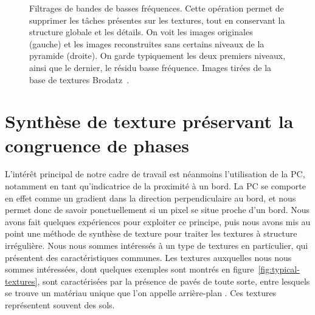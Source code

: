 \begin{figure}
    \caption[Filtrage de bandes de basses fréquences]{Filtrages de bandes de basses fréquences. Cette opération permet de supprimer les tâches présentes sur les textures, tout en conservant la structure globale et les détails. On voit les images originales (gauche) et les images reconstruites sans certains niveaux de la pyramide (droite). On garde typiquement les deux premiers niveaux, ainsi que le dernier, le résidu basse fréquence. Images tirées de la base de textures Brodatz~\cite{abdelmounaime_new_2013}.}
    \label{fig:filter-low-freq}
\end{figure}

\section{Synthèse de texture préservant la congruence de phases}

L'intérêt principal de notre cadre de travail est néanmoins l'utilisation de la PC, notamment en tant qu'indicatrice de la proximité à un bord. La PC se comporte en effet comme un gradient dans la direction perpendiculaire au bord, et nous permet donc de savoir ponctuellement si un pixel se situe proche d'un bord. Nous avons fait quelques expériences pour exploiter ce principe, puis nous avons mis au point une méthode de synthèse de texture pour traiter les textures à structure irrégulière. Nous nous sommes intéressés à un type de textures en particulier, qui présentent des caractéristiques communes. Les textures auxquelles nous nous sommes intéressées, dont quelques exemples sont montrés en figure~\ref{fig:typical-textures}, sont caractérisées par la présence de pavés de toute sorte, entre lesquels se trouve un matériau unique que l'on appelle \og arrière-plan \fg. Ces textures représentent souvent des sols.

\bigskip

